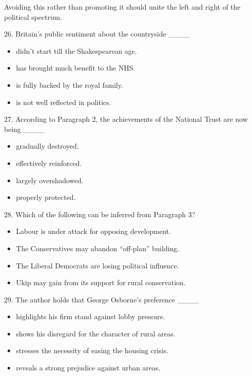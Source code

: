 \documentclass[UTF8,11pt]{ctexart}
\begin{document}
Avoiding this rather than promoting it should unite the left and right of the political spectrum.


26. Britain’s public sentiment about the countryside \_\_\_\_


\begin{itemize}[leftmargin=2em,itemsep=.2em,topsep=.4em]\item[A.] didn’t start till the Shakespearean age.
\item[B.] has brought much benefit to the NHS.
\item[C.] is fully backed by the royal family.
\item[D.] is not well reflected in politics.
\end{itemize}

27. According to Paragraph 2, the achievements of the National Trust are now being \_\_\_\_


\begin{itemize}[leftmargin=2em,itemsep=.2em,topsep=.4em]\item[A.] gradually destroyed.
\item[B.] effectively reinforced.
\item[C.] largely overshadowed.
\item[D.] properly protected.
\end{itemize}

28. Which of the following can be inferred from Paragraph 3?


\begin{itemize}[leftmargin=2em,itemsep=.2em,topsep=.4em]\item[A.] Labour is under attack for opposing development.
\item[B.] The Conservatives may abandon “off-plan” building.
\item[C.] The Liberal Democrats are losing political influence.
\item[D.] Ukip may gain from its support for rural conservation.
\end{itemize}

29. The author holds that George Osborne’s preference \_\_\_\_


\begin{itemize}[leftmargin=2em,itemsep=.2em,topsep=.4em]\item[A.] highlights his firm stand against lobby pressure.
\item[B.] shows his disregard for the character of rural areas.
\item[C.] stresses the necessity of easing the housing crisis.
\item[D.] reveals a strong prejudice against urban areas.
\end{itemize}
\end{document}
